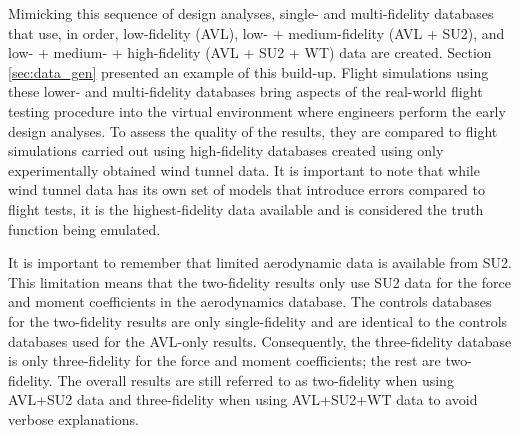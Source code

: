 Mimicking this sequence of design analyses, single- and multi-fidelity databases that use, in order, low-fidelity (AVL), low- + medium-fidelity (AVL + SU2), and low- + medium- + high-fidelity (AVL + SU2 + WT) data are created. 
Section \ref{sec:data_gen} presented an example of this build-up.
Flight simulations using these lower- and multi-fidelity databases bring aspects of the real-world flight testing procedure into the virtual environment where engineers perform the early design analyses.
To assess the quality of the results, they are compared to flight simulations carried out using high-fidelity databases created using only experimentally obtained wind tunnel data. 
It is important to note that while wind tunnel data has its own set of models that introduce errors compared to flight tests, it is the highest-fidelity data available and is considered the truth function being emulated. 

It is important to remember that limited aerodynamic data is available from SU2. 
This limitation means that the two-fidelity results only use SU2 data for the force and moment coefficients in the aerodynamics database.
The controls databases for the two-fidelity results are only single-fidelity and are identical to the controls databases used for the AVL-only results. 
Consequently, the three-fidelity database is only three-fidelity for the force and moment coefficients; the rest are two-fidelity.
The overall results are still referred to as two-fidelity when using AVL+SU2 data and three-fidelity when using AVL+SU2+WT data to avoid verbose explanations.

